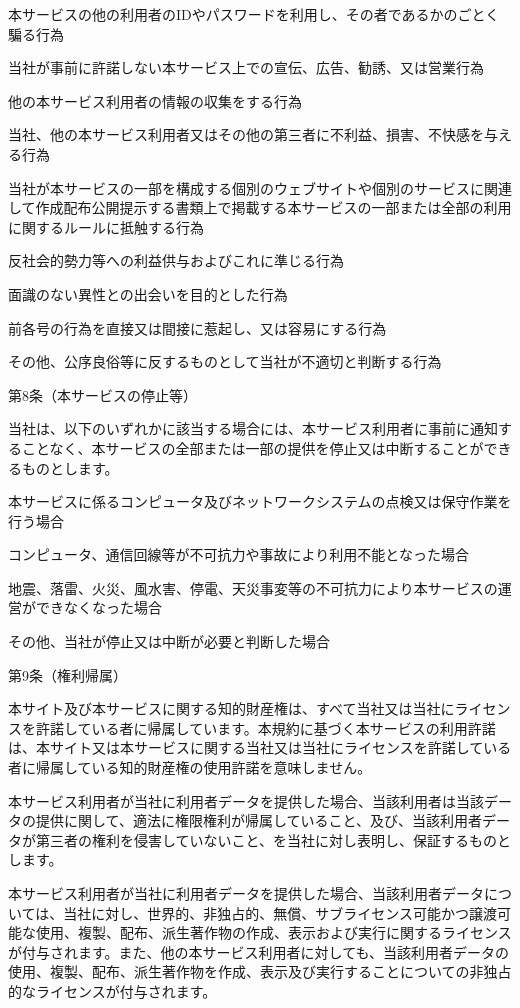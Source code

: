     本サービスの他の利用者のIDやパスワードを利用し、その者であるかのごとく騙る行為

    当社が事前に許諾しない本サービス上での宣伝、広告、勧誘、又は営業行為

    他の本サービス利用者の情報の収集をする行為

    当社、他の本サービス利用者又はその他の第三者に不利益、損害、不快感を与える行為

    当社が本サービスの一部を構成する個別のウェブサイトや個別のサービスに関連して作成配布公開提示する書類上で掲載する本サービスの一部または全部の利用に関するルールに抵触する行為

    反社会的勢力等への利益供与およびこれに準じる行為

    面識のない異性との出会いを目的とした行為

    前各号の行為を直接又は間接に惹起し、又は容易にする行為

    その他、公序良俗等に反するものとして当社が不適切と判断する行為

第8条（本サービスの停止等）

当社は、以下のいずれかに該当する場合には、本サービス利用者に事前に通知することなく、本サービスの全部または一部の提供を停止又は中断することができるものとします。

    本サービスに係るコンピュータ及びネットワークシステムの点検又は保守作業を行う場合

    コンピュータ、通信回線等が不可抗力や事故により利用不能となった場合

    地震、落雷、火災、風水害、停電、天災事変等の不可抗力により本サービスの運営ができなくなった場合

    その他、当社が停止又は中断が必要と判断した場合

第9条（権利帰属）

    本サイト及び本サービスに関する知的財産権は、すべて当社又は当社にライセンスを許諾している者に帰属しています。本規約に基づく本サービスの利用許諾は、本サイト又は本サービスに関する当社又は当社にライセンスを許諾している者に帰属している知的財産権の使用許諾を意味しません。

    本サービス利用者が当社に利用者データを提供した場合、当該利用者は当該データの提供に関して、適法に権限権利が帰属していること、及び、当該利用者データが第三者の権利を侵害していないこと、を当社に対し表明し、保証するものとします。

    本サービス利用者が当社に利用者データを提供した場合、当該利用者データについては、当社に対し、世界的、非独占的、無償、サブライセンス可能かつ譲渡可能な使用、複製、配布、派生著作物の作成、表示および実行に関するライセンスが付与されます。また、他の本サービス利用者に対しても、当該利用者データの使用、複製、配布、派生著作物を作成、表示及び実行することについての非独占的なライセンスが付与されます。

